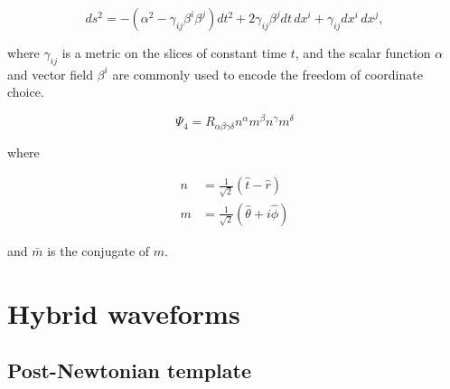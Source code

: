 \begin{equation*}
ds^2 = -(\alpha^{2}-\gamma_{ij}\beta^{i}\beta^{j})dt^{2}
   + 2 \gamma_{ij}\beta^{j}dt\,dx^{i}
   + \gamma_{ij}dx^{i}\,dx^{j}, 
\end{equation*}

where $\gamma_{ij}$ is a metric on the slices of
constant time $t$, and the scalar function $\alpha$ and  
vector field $\beta^i$ are commonly used to encode the freedom of
coordinate choice. 


\begin{equation*}
\Psi_4 = R_{\alpha \beta \gamma \delta} n^\alpha m^\beta n^\gamma
m^\delta
\end{equation*}

where

\begin{align*}
n &= \frac{1}{\sqrt{2}} \left(\hat{t} - \hat{r}\right) \\
m &= \frac{1}{\sqrt{2}} \left(\hat{\theta} +i  \hat{\phi}\right)
\end{align*}

and $\bar{m}$ is the conjugate of $m$.


\section{Hybrid waveforms}
\label{sec:HybridWaveforms}


\iffalse

\subsection{Post-{N}ewtonian template}
\label{sec:PNWaveforms}

